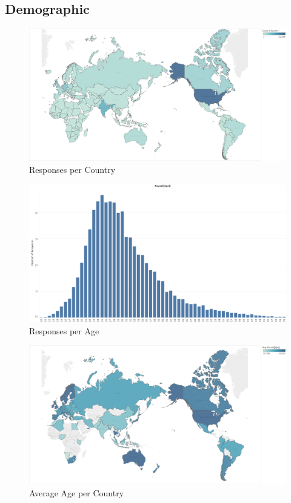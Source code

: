 \documentclass{scrartcl}
\begin{document}
\subsection{Demographic}
\begin{figure}[p]
    \centering
    \includegraphics[width=\linewidth]{Documentation/images/map.png}
    \caption{Responses per Country}
    \label{fig:country_responses}
\end{figure}
\begin{figure}[p]
    \centering
    \includegraphics[width=\linewidth]{Documentation/images/age.png}
    \caption{Responses per Age}
    \label{fig:age_responses}
\end{figure}
\begin{figure}[p]
    \centering
    \includegraphics[width=\linewidth]{Documentation/images/average_age.png}
    \caption{Average Age per Country}
    \label{fig:average_age}
\end{figure}
\end{document}
